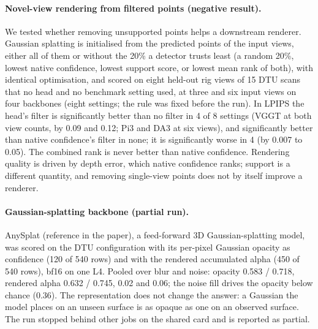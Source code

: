 \paragraph{Novel-view rendering from filtered points (negative result).}
We tested whether removing unsupported points helps a downstream renderer. Gaussian splatting is initialised from the predicted points of the input views, either all of them or without the 20\% a detector trusts least (a random 20\%, lowest native confidence, lowest support score, or lowest mean rank of both), with identical optimisation, and scored on eight held-out rig views of 15 DTU scans that no head and no benchmark setting used, at three and six input views on four backbones (eight settings; the rule was fixed before the run). In LPIPS the head's filter is significantly better than no filter in 4 of 8 settings (VGGT at both view counts, by 0.09 and 0.12; Pi3 and DA3 at six views), and significantly better than native confidence's filter in none; it is significantly worse in 4 (by 0.007 to 0.05). The combined rank is never better than native confidence. Rendering quality is driven by depth error, which native confidence ranks; support is a different quantity, and removing single-view points does not by itself improve a renderer.

\paragraph{Gaussian-splatting backbone (partial run).}
AnySplat (reference in the paper), a feed-forward 3D Gaussian-splatting model, was scored on the DTU configuration with its per-pixel Gaussian opacity as confidence (120 of 540 rows) and with the rendered accumulated alpha (450 of 540 rows), bf16 on one L4. Pooled over blur and noise: opacity \auroc{} 0.583 / \cur{} 0.718, rendered alpha 0.632 / 0.745, \curerr{} 0.02 and 0.06; the noise fill drives the opacity below chance (0.36). The representation does not change the answer: a Gaussian the model places on an unseen surface is as opaque as one on an observed surface. The run stopped behind other jobs on the shared card and is reported as partial.
